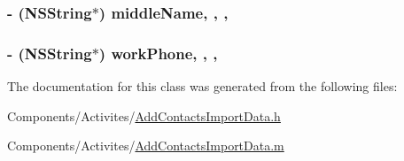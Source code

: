 \hypertarget{interface_add_contacts_import_data_a9b2b6cb080ea28ad7fab14029efcadbc}{
\subsubsection[{middle\-Name}]{\setlength{\rightskip}{0pt plus 5cm}-\/ (N\-S\-String$\ast$) middle\-Name\hspace{0.3cm}{\ttfamily [read]}, {\ttfamily [write]}, {\ttfamily [nonatomic]}, {\ttfamily [strong]}}}\label{interface_add_contacts_import_data_a9b2b6cb080ea28ad7fab14029efcadbc}
\hypertarget{interface_add_contacts_import_data_a00262e9fa1de536c3154762383b0d575}{
\subsubsection[{work\-Phone}]{\setlength{\rightskip}{0pt plus 5cm}-\/ (N\-S\-String$\ast$) work\-Phone\hspace{0.3cm}{\ttfamily [read]}, {\ttfamily [write]}, {\ttfamily [nonatomic]}, {\ttfamily [strong]}}}\label{interface_add_contacts_import_data_a00262e9fa1de536c3154762383b0d575}


The documentation for this class was generated from the following files\-:\begin{DoxyCompactItemize}
\item 
Components/\-Activites/\hyperlink{_add_contacts_import_data_8h}{Add\-Contacts\-Import\-Data.\-h}\item 
Components/\-Activites/\hyperlink{_add_contacts_import_data_8m}{Add\-Contacts\-Import\-Data.\-m}\end{DoxyCompactItemize}
